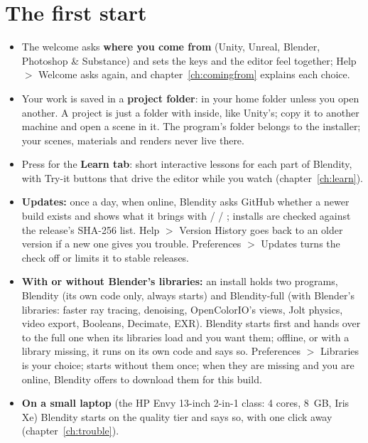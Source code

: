 \section{The first start}
\begin{itemize}
  \item The welcome asks \textbf{where you come from} (Unity, Unreal, Blender, Photoshop \& Substance) and sets the keys and
    the editor feel together; Help $>$ Welcome asks again, and chapter~\ref{ch:comingfrom} explains each choice.
  \item Your work is saved in a \textbf{project folder}:  in your home folder unless you open
    another. A project is just a folder with  inside, like Unity's; copy it to another machine and open a
    scene in it. The program's folder belongs to the installer; your scenes, materials and renders never live there.
  \item Press  for the \textbf{Learn tab}: short interactive lessons for each part of Blendity, with Try-it
    buttons that drive the editor while you watch (chapter~\ref{ch:learn}).
  \item \textbf{Updates:} once a day, when online, Blendity asks GitHub whether a newer build exists and shows what it
    brings with  /  / ; installs are checked against the release's SHA-256
    list. Help $>$ Version History goes back to an older version if a new one gives you trouble. Preferences $>$ Updates
    turns the check off or limits it to stable releases.
  \item \textbf{With or without Blender's libraries:} an install holds two programs, Blendity (its own code only, always
    starts) and Blendity-full (with Blender's libraries: faster ray tracing, denoising, OpenColorIO's views, Jolt
    physics, video export, Booleans, Decimate, EXR). Blendity starts first and hands over to the full one when its
    libraries load and you want them; offline, or with a library missing, it runs on its own code and says so.
    Preferences $>$ Libraries is your choice;  starts without them once; when they are missing and you
    are online, Blendity offers to download them for this build.
  \item \textbf{On a small laptop} (the HP Envy 13-inch 2-in-1 class: 4 cores, 8~GB, Iris Xe) Blendity starts on the
     quality tier and says so, with  one click away (chapter~\ref{ch:trouble}).
\end{itemize}

